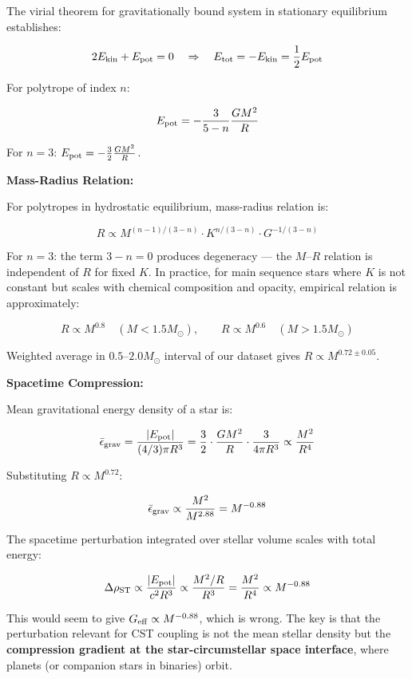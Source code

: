 \documentclass[11pt,a4paper]{article}
\begin{document}
The virial theorem for gravitationally bound system in stationary
equilibrium establishes:

\[2E_{\rm kin} + E_{\rm pot} = 0 \quad \Rightarrow \quad E_{\rm tot} = -E_{\rm kin} = \frac{1}{2}E_{\rm pot}\]

For polytrope of index \(n\):

\[E_{\rm pot} = -\frac{3}{5-n}\frac{GM^2}{R}\]

For \(n=3\): \(E_{\rm pot} = -\frac{3}{2}\frac{GM^2}{R}\).

\textbf{Mass-Radius Relation:}

For polytropes in hydrostatic equilibrium, mass-radius relation is:

\[R \propto M^{(n-1)/(3-n)} \cdot K^{n/(3-n)} \cdot G^{-1/(3-n)}\]

For \(n=3\): the term \(3-n = 0\) produces degeneracy --- the
\(M\)--\(R\) relation is independent of \(R\) for fixed \(K\). In
practice, for main sequence stars where \(K\) is not constant but scales
with chemical composition and opacity, empirical relation is
approximately:

\[R \propto M^{0.8} \quad (M < 1.5 M_\odot), \qquad R \propto M^{0.6} \quad (M > 1.5 M_\odot)\]

Weighted average in \(0.5\)--\(2.0 M_\odot\) interval of our dataset
gives \(R \propto M^{0.72 \pm 0.05}\).

\textbf{Spacetime Compression:}

Mean gravitational energy density of a star is:

\[\bar\epsilon_{\rm grav} = \frac{|E_{\rm pot}|}{(4/3)\pi R^3} = \frac{3}{2} \cdot \frac{GM^2}{R} \cdot \frac{3}{4\pi R^3} \propto \frac{M^2}{R^4}\]

Substituting \(R \propto M^{0.72}\):

\[\bar\epsilon_{\rm grav} \propto \frac{M^2}{M^{2.88}} = M^{-0.88}\]

The spacetime perturbation integrated over stellar volume scales with
total energy:

\[\Delta\rho_{\rm ST} \propto \frac{|E_{\rm pot}|}{c^2 R^3} \propto \frac{M^2/R}{R^3} = \frac{M^2}{R^4} \propto M^{-0.88}\]

This would seem to give \(G_{\rm eff} \propto M^{-0.88}\), which is
wrong. The key is that the perturbation relevant for CST coupling is not
the mean stellar density but the \textbf{compression gradient at the
star-circumstellar space interface}, where planets (or companion stars
in binaries) orbit.
\end{document}
